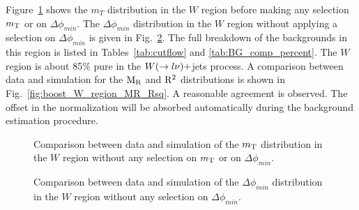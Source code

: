 Figure~\ref{fig:boost_W_region_mT} shows the $m_T$ distribution in the $W$ region before making any
selection $m_{\mathrm{T}}$ or on $\Delta\phi_{min}$. The $\Delta\phi_{min}$ distribution in the $W$ region
without applying a selection on $\Delta\phi_{min}$ is given in
Fig.~\ref{fig:boost_W_region_mindeltaphi}. The full breakdown of the backgrounds in this region is
listed in Tables~\ref{tab:cutflow} and \ref{tab:BG_comp_percent}. The $W$ region is about 85\% pure
in the $W(\rightarrow l\nu)+$jets process. 
A comparison between data and simulation for the $\mathrm{M_R}$ and $\mathrm{R^2}$ distributions is shown in
Fig.~\ref{fig:boost_W_region_MR_Rsq}. A reasonable agreement is observed. The offset in the
normalization will be absorbed automatically during the background estimation procedure. 

\begin{figure}[htbp]
\centering
\caption{Comparison between data and simulation of the $m_{\mathrm{T}}$ distribution in the $W$ region without
any selection on $m_{\mathrm{T}}$ or on $\Delta\phi_{min}$.
\label{fig:boost_W_region_mT}}
\end{figure}

\begin{figure}[htbp]
\centering
\caption{Comparison between data and simulation of the $\Delta\phi_{min}$ distribution in the $W$
region without any selection on $\Delta\phi_{min}$.
\label{fig:boost_W_region_mindeltaphi}}
\end{figure}

